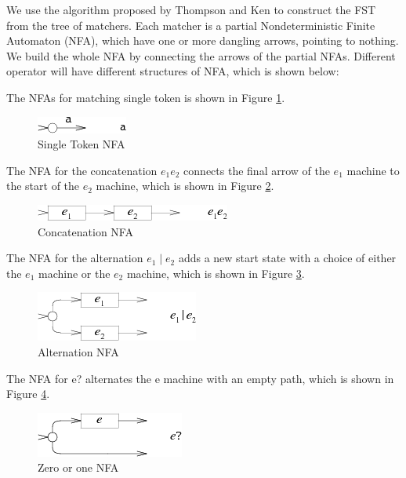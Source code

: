 We use the algorithm proposed by Thompson and Ken\cite{thompson1968programming} to construct the FST from the tree of matchers. Each matcher is a partial Nondeterministic Finite Automaton (NFA), which have one or more dangling arrows, pointing to nothing. We build the whole NFA by connecting the arrows of the partial NFAs. Different operator will have different structures of NFA, which is shown below:

The NFAs for matching single token is shown in Figure \ref{fig:nfa_single}.

\begin{figure}[htbp]
  \centering
  \includegraphics[scale=1]{images/single_token.png}
  \caption{Single Token NFA}
  \label{fig:nfa_single}
\end{figure}

The NFA for the concatenation $e_1e_2$ connects the final arrow of the $e_1$ machine to the start of the $e_2$ machine, which is shown in Figure \ref{fig:nfa_cocat}.

\begin{figure}[htbp]
  \centering
  \includegraphics[scale=1]{images/concatenation_tokens.png}
  \caption{Concatenation NFA}
  \label{fig:nfa_cocat}
\end{figure}

The NFA for the alternation $e_1\mid e_2$ adds a new start state with a choice of either the $e_1$ machine or the $e_2$ machine, which is shown in Figure \ref{fig:nfa_alternation}.


\begin{figure}[htbp]
  \centering
  \includegraphics[scale=1]{images/alternation.png}
  \caption{Alternation NFA}
  \label{fig:nfa_alternation}
\end{figure}

The NFA for e? alternates the e machine with an empty path, which is shown in Figure \ref{fig:nfa_question}.


\begin{figure}[htbp]
  \centering
  \includegraphics[scale=1]{images/question.png}
  \caption{Zero or one NFA}
  \label{fig:nfa_question}
\end{figure}

